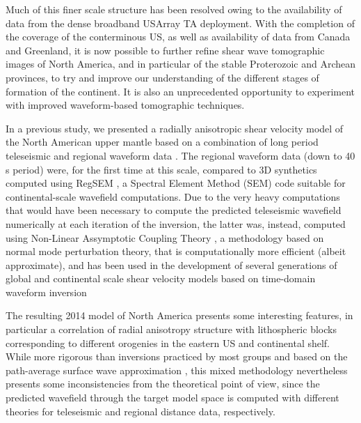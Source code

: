 \documentclass[12pt]{article}
\begin{document}
Much of this finer scale structure has been resolved owing to the availability of data from the dense broadband USArray TA deployment. With the completion of the coverage of the conterminous US, as well as availability of data from Canada and Greenland, it is now possible to further refine shear wave tomographic images of North America, and in particular of the stable Proterozoic and Archean provinces, to try and improve our understanding of the different stages of formation of the continent. It is also an unprecedented opportunity to experiment with improved waveform-based tomographic techniques.

In a previous study, we presented a radially anisotropic shear velocity model of the North American upper mantle based on a combination of long period teleseismic and regional waveform data \citep{yuan2014lithospheric}. The regional waveform data (down to 40 s period) were, for the first time at this scale, compared to 3D synthetics computed using RegSEM \citep{cupillard2012regsem}, a Spectral Element Method (SEM) code suitable for continental-scale wavefield computations. Due to the very heavy computations that would have been necessary to compute the predicted teleseismic wavefield numerically at each iteration of the inversion, the latter was, instead, computed using Non-Linear Assymptotic Coupling Theory \citep[NACT,][]{li1995comparison}, a methodology based on normal mode perturbation theory, that is computationally more efficient (albeit approximate), and has been used in the development of several generations of global and continental scale shear velocity models based on time-domain waveform inversion \citep{li1996global,megnin2000three,gung2003global,panning2006three,yuan20113}
 
The resulting 2014 model of North America presents some interesting features, in particular a correlation of radial anisotropy structure with lithospheric blocks corresponding to different orogenies in the eastern US and continental shelf. 
While more rigorous than inversions practiced by most groups and based on the path-average surface wave approximation \citep[PAVA,][]{woodhouse1984mapping}, this mixed methodology nevertheless presents some inconsistencies from the theoretical point of view, since the predicted wavefield through the target model space is computed with different theories for teleseismic and regional distance data, respectively.
\end{document}
